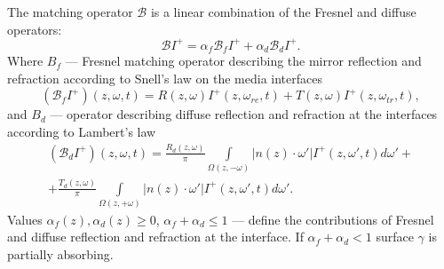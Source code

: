 \documentclass[12pt,reqno]{report}
\begin{document}
The matching operator $\mathcal B$ is a linear combination of the Fresnel and diffuse operators:
\begin{equation}
\mathcal BI^+ = \alpha_f \mathcal B_{f}I^+ + \alpha_d \mathcal
B_{d}I^+.
\end{equation}
Where $B_{f}$ ---  Fresnel matching operator describing the mirror reflection and refraction according to Snell's law on the media interfaces  \cite{20,22,29,31,33}
\begin{equation}
(\mathcal B_{f}I^+)(z,\omega,t) = R(z,\omega)
I^+(z,\omega_{re},t) + T(z,\omega) I^+(z,\omega_{tr},t),
\end{equation}
and         $B_{d}$ ---  operator describing diffuse reflection and refraction \cite{30,32} at the interfaces according to Lambert's law  
\begin{multline}
(\mathcal B_d I^+)(z,\omega,t) = \frac{R_d (z,\omega)}{\pi}\int
\limits_{\Omega(z,-\omega)}|n(z)\cdot \omega'| I^+(z,\omega',t)d
\omega' + \\+ \frac{T_d (z,\omega)}{\pi} \int
\limits_{\Omega(z,+\omega)}|n(z)\cdot \omega'| I^+(z,\omega',t) d
\omega'.
\end{multline}
Values $ \alpha_f(z),\alpha_d(z) \geq 0$, $ \alpha_f +\alpha_d \leq 1$  --- define the contributions 
of Fresnel and diffuse reflection and refraction at the interface. 
If $\alpha_f +\alpha_d < 1$ surface $\gamma$ is partially absorbing.
\end{document}
